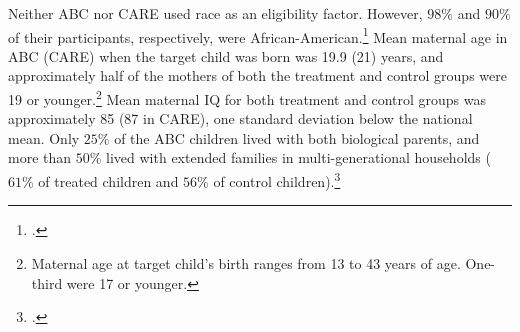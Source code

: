 \noindent Neither ABC nor CARE used race as an eligibility factor. However, $98\%$ and $90\%$ of their participants, respectively, were African-American.\footnote{\citet{Ramey_Smith_1977_AJMD,Ramey_Campbell_1984_AJMD,Ramey_Campbell_1991_childreninpoverty,Campbell_Pungello_etal_2001_DP}.} Mean maternal age in ABC (CARE) when the target child was born was 19.9 (21) years, and approximately half of the mothers of both the treatment and control groups were 19 or younger.\footnote{Maternal age at target child's birth ranges from 13 to 43 years of age. One-third were 17 or younger.} Mean maternal IQ for both treatment and control groups was approximately 85 (87 in CARE), one standard deviation below the national mean. Only $25\%$ of the ABC children lived with both biological parents, and more than $50\%$ lived with extended families in multi-generational households ($61\%$ of treated children and $56\%$ of control children).\footnote{\citet{Ramey_Campbell_1991_childreninpoverty,Campbell_Ramey_1994_CD}.}\\

